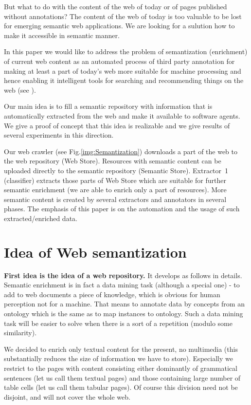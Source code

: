\documentclass{www2009-submission}
\begin{document}
But what to do with the content of the web of today or of pages published without annotations? The content of the web of today is too valuable to be lost for emerging semantic web applications. We are looking for a sulution how to make it accessible in semantic manner. \par

In this paper we would like to address the problem of semantization (enrichment) of current web content as an automated process of third party annotation for making at least a part of today's web more suitable for machine processing and hence enabling it intelligent tools for searching and recommending things on the web (see \cite{biblio:LeeWebThings}). \par

Our main idea is to fill a semantic repository with information that is automatically extracted from the web and make it available to software agents. We give a proof of concept that this idea is realizable and we give results of several experiments in this direction.

Our web crawler (see Fig.\ref{img:Semantization}) downloads a part of the web to the web repository (Web Store). Resources with semantic content can be uploaded directly to the semantic repository (Semantic Store). Extractor~1 (classifier) extracts those parts of Web Store which are suitable for further semantic enrichment (we are able to enrich only a part of resources). More semantic content is created by several extractors and annotators in several phases. The emphasis of this paper is on the automation and the usage of such extracted/enriched data.


\section{Idea of Web semantization}

\textbf{First idea is the idea of a web repository.} It develops as follows in details. Semantic enrichment is in fact a data mining task (although a special one) - to add to web documents a piece of knowledge, which is obvious for human perception not for a machine. That means to annotate data by concepts from an ontology which is the same as to map instances to ontology. Such a data mining task will be easier to solve when there is a sort of a repetition (modulo some similarity).\par 
We decided to enrich only textual content for the present, no multimedia (this substantially reduces the size of information we have to store). Especially we restrict to the pages with content consisting either dominantly of grammatical sentences (let us call them textual pages) and those containing large number of table cells (let us call them tabular pages). Of course this division need not be disjoint, and will not cover the whole web. 
\end{document}
